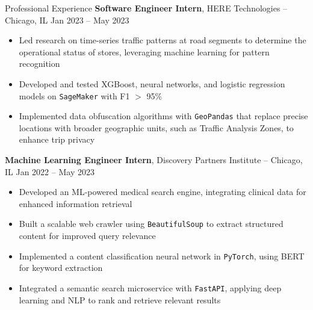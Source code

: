\documentclass[hidelinks]{resume} %
\begin{document}
\vspace{-5pt}
\begin{rSection}{P\MakeLowercase{rofessional} E\MakeLowercase{xperience}}
\textbf{Software Engineer Intern}, HERE Technologies – Chicago, IL
\hfill Jan 2023 -- May 2023
\vspace{-5pt}
\begin{itemize}
\itemsep -7pt {} 
\item Led research on time-series traffic patterns at road segments to determine the operational status of stores, leveraging machine learning for pattern recognition
\item Developed and tested XGBoost, neural networks, and logistic regression models on \texttt{SageMaker} with F1 $>$ 95\%
\item Implemented data obfuscation algorithms with \texttt{GeoPandas} that replace precise locations with broader geographic units, such as Traffic Analysis Zones, to enhance trip privacy
 \end{itemize}



\vspace{-2pt}
\textbf{Machine Learning Engineer Intern}, Discovery Partners Institute -- Chicago, IL 
\hfill Jan 2022 -- May 2023
\vspace{-5pt}
\begin{itemize}
\itemsep -7pt {} 
\item Developed an ML-powered medical search engine, integrating clinical data for enhanced information retrieval
\item Built a scalable web crawler using \texttt{BeautifulSoup} to extract structured content for improved query relevance
\item Implemented a content classification neural network in \texttt{PyTorch}, using BERT for keyword extraction
\item Integrated a semantic search microservice with \texttt{FastAPI}, applying deep learning and NLP to rank and retrieve relevant results
\end{itemize}


\end{rSection}
\end{document}
